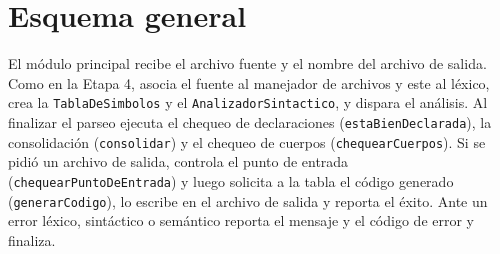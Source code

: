\documentclass[11pt,a4paper]{article}
\begin{document}
\section{Esquema general}

El módulo principal recibe el archivo fuente y el nombre del archivo de salida.
Como en la Etapa 4, asocia el fuente al manejador de archivos y este al léxico,
crea la \texttt{TablaDeSimbolos} y el \texttt{AnalizadorSintactico}, y dispara el
análisis. Al finalizar el parseo ejecuta el chequeo de declaraciones
(\texttt{estaBienDeclarada}), la consolidación (\texttt{consolidar}) y el chequeo
de cuerpos (\texttt{chequearCuerpos}). Si se pidió un archivo de salida, controla
el punto de entrada (\texttt{chequearPuntoDeEntrada}) y luego solicita a la tabla
el código generado (\texttt{generarCodigo}), lo escribe en el archivo de salida y
reporta el éxito. Ante un error léxico, sintáctico o semántico reporta el mensaje
y el código de error y finaliza.
\end{document}
